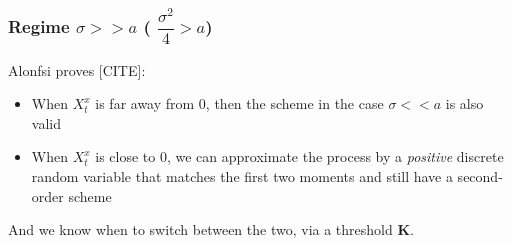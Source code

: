 \documentclass[12pt]{beamer}
\begin{document}
\begin{frame}
\frametitle{Regime $\sigma >> a$ ( $\dfrac{\sigma^{2}}{4} > a $) }

Alonfsi proves [CITE]:

\begin{itemize}
	\item When $X^{x}_{t}$ is far away from 0, then the scheme in the case $\sigma << a$ is also valid
	\item When $X^{x}_{t}$ is close to 0, we can approximate the process by a \textit{positive} discrete random variable that matches the first two moments and still have a second-order scheme
\end{itemize}

And we know when to switch between the two, via a threshold $\mathbf{K}$.
\end{frame}
\end{document}
